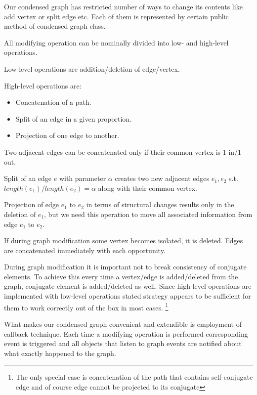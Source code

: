\documentclass[12pt]{article}
\begin{document}
Our condensed graph has restricted number of ways to change its contents like add vertex or split edge etc. Each of them is represented by certain public method of condensed graph class.

All modifying operation can be nominally divided into low- and high-level operations.

Low-level operations are addition/deletion of edge/vertex.

High-level operations are:
\begin{itemize}
\item Concatenation of a path.
\item Split of an edge in a given proportion. 
\item Projection of one edge to another.
\end{itemize}

Two adjacent edges can be concatenated only if their common vertex is 1-in/1-out.

Split of an edge $e$ with parameter $\alpha$ creates two new adjacent edges $e_1, e_2$ s.t. $length(e_1)/length(e_2) = \alpha$ along with their common vertex.

Projection of edge $e_1$ to $e_2$ in terms of structural changes results only in the deletion of $e_1$, but we need this operation to move all associated information from edge $e_1$ to $e_2$.

If during graph modification some vertex becomes isolated, it is deleted. Edges are concatenated immediately with each opportunity.

During graph modification it is important not to break consistency of conjugate elements. 
To achieve this every time a vertex/edge is added/deleted from the graph, conjugate element is added/deleted as well.
Since high-level operations are implemented with low-level operations stated strategy appears to be sufficient for them to work correctly out of the box in most cases. \footnote{The only special case is concatenation of the path that contains self-conjugate edge and of course edge cannot be projected to its conjugate}


What makes our condensed graph convenient and extendible is employment of callback technique. Each time a modifying operation is performed corresponding event is triggered and all objects that listen to graph events are notified about what exactly happened to the graph.%
\end{document}
